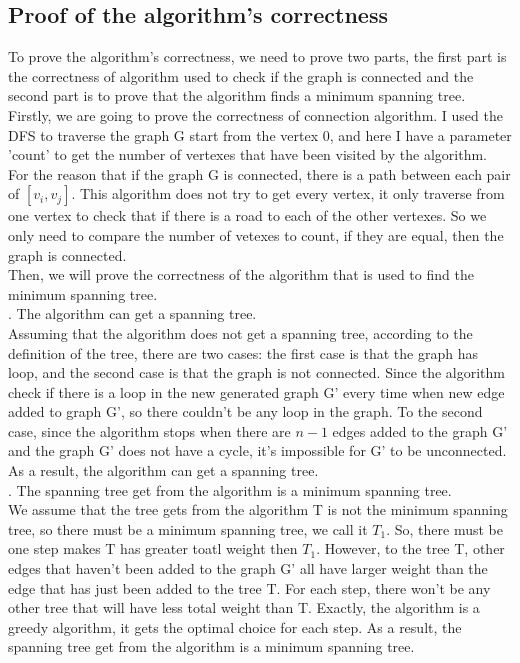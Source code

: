 \documentclass[]{article}
\begin{document}
	\subsection{Proof of the algorithm's correctness}
	
	To prove the algorithm's correctness, we need to prove two parts, the first part is the correctness of algorithm used to check if the graph is connected and the second part is to prove that the algorithm finds a minimum spanning tree.  \\
	
	\noindent Firstly, we are going to prove the correctness of connection algorithm. I used the DFS to traverse the graph G start from the vertex 0, and here I have a parameter 'count' to get the number of vertexes that have been visited by the algorithm. For the reason that if the graph G is connected, there is a path between each pair of $[v_{i},v_{j}]$. This algorithm does not try to get every vertex, it only traverse from one vertex to check that if there is a road to each of the other vertexes. So we only need to compare the number of vetexes to count, if they are equal, then the graph is connected.   \\
	
	\noindent Then, we will prove the correctness of the algorithm that is used to find the minimum spanning tree.  \\
	
	. The algorithm can get a spanning tree. \\
	
	\noindent Assuming that the algorithm does not get a spanning tree, according to the definition of the tree, there are two cases: the first case is that the graph has loop, and the second case is that the graph is not connected. Since the algorithm check if there is a loop in the new generated graph G' every time when new edge added to graph G', so there couldn't be any loop in the graph. To the second case, since the algorithm stops when there are $n-1$ edges added to the graph G' and the graph G' does not have a cycle, it's impossible for G' to be unconnected. As a result, the algorithm can get a spanning tree.   \\
	
	. The spanning tree get from the algorithm is a minimum spanning tree. \\
	
	\noindent We assume that the tree gets from the algorithm T is not the minimum spanning tree, so there must be a minimum spanning tree, we call it $T_{1}$. So, there must be one step makes T has greater toatl weight then $T_{1}$. However, to the tree T, other edges that haven't been added to the graph G' all have larger weight than the edge that has just been added to the tree T. For each step, there won't be any other tree that will have less total weight than T. Exactly, the algorithm is a greedy algorithm, it gets the optimal choice for each step. As a result, the spanning tree get from the algorithm is a minimum spanning tree. \\
	
\end{document}
